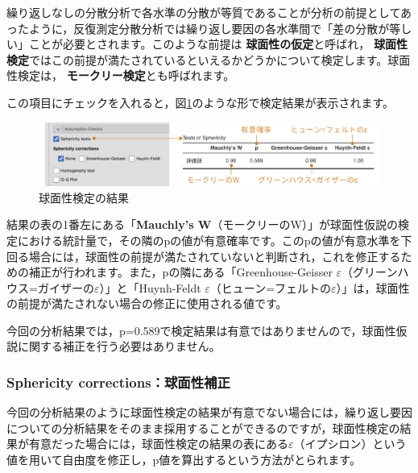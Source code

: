\documentclass[
  12pt,
  a5jpaper,
  lualatex, ja=standard]{bxjsbook}
\renewcommand{\emph}[1]{\textbf{\color{emph} #1}}
\begin{document}
繰り返しなしの分散分析で各水準の分散が等質であることが分析の前提としてあったように，反復測定分散分析では繰り返し要因の各水準間で「差の分散が等しい」ことが必要とされます。このような前提は\emph{球面性の仮定}と呼ばれ，\emph{球面性検定}ではこの前提が満たされているといえるかどうかについて検定します。球面性検定は，\emph{モークリー検定}とも呼ばれます。

この項目にチェックを入れると，図\ref{fig:ANOVA-rm-sphericity-tests}のような形で検定結果が表示されます。

\begin{figure}[!ht]

{\centering \includegraphics[width=1\linewidth]{images/ANOVA/rm-sphericity-tests} 

}

\caption{球面性検定の結果}\label{fig:ANOVA-rm-sphericity-tests}
\end{figure}

結果の表の1番左にある「\textbf{Mauchly's W}（モークリーのW）」が球面性仮説の検定における統計量で，その隣のpの値が有意確率です。このpの値が有意水準を下回る場合には，球面性の前提が満たされていないと判断され，これを修正するための補正が行われます。また，pの隣にある「Greenhouse-Geisser \(\varepsilon\)（グリーンハウス=ガイザーの\(\varepsilon\)）」と「Huynh-Feldt \(\varepsilon\)（ヒューン=フェルトの\(\varepsilon\)）」は，球面性の前提が満たされない場合の修正に使用される値です。

今回の分析結果では，p=0.589で検定結果は有意ではありませんので，球面性仮説に関する補正を行う必要はありません。

\hypertarget{sphericity-correctionsux7403ux9762ux6027ux88dcux6b63}{%
\subsubsection*{Sphericity corrections：球面性補正}\label{sphericity-correctionsux7403ux9762ux6027ux88dcux6b63}}

今回の分析結果のように球面性検定の結果が有意でない場合には，繰り返し要因についての分析結果をそのまま採用することができるのですが，球面性検定の結果が有意だった場合には，球面性検定の結果の表にある\(\varepsilon\)（イプシロン）という値を用いて自由度を修正し，p値を算出するという方法がとられます。
\end{document}
